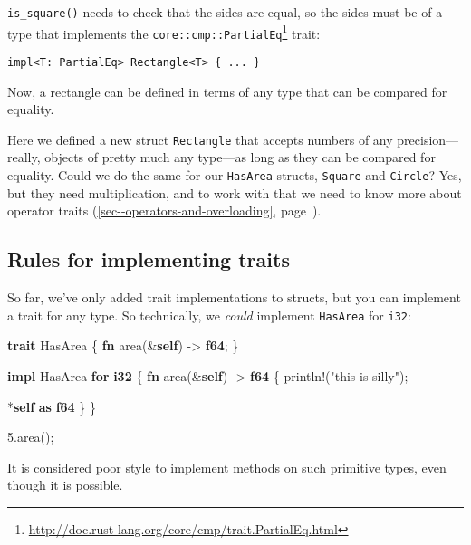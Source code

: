 \documentclass[a4paper,]{book}
\renewcommand*{\hyperref}[2][\ar]{%
  \def\ar{#2}%
  #2 (\autoref{#1}, page~\pageref{#1})}
\newenvironment{Shaded}{\begin{snugshade}}{\end{snugshade}}
\newcommand{\KeywordTok}[1]{\textcolor[rgb]{0.13,0.29,0.53}{\textbf{{#1}}}}
\newcommand{\DecValTok}[1]{\textcolor[rgb]{0.00,0.00,0.81}{{#1}}}
\newcommand{\StringTok}[1]{\textcolor[rgb]{0.31,0.60,0.02}{{#1}}}
\newcommand{\OtherTok}[1]{\textcolor[rgb]{0.56,0.35,0.01}{{#1}}}
\newcommand{\NormalTok}[1]{{#1}}
\renewcommand{\href}[2]{#2\footnote{\url{#1}}}
\begin{document}
\texttt{is\_square()} needs to check that the sides are equal, so the
sides must be of a type that implements the
\href{http://doc.rust-lang.org/core/cmp/trait.PartialEq.html}{\texttt{core::cmp::PartialEq}}
trait:

\begin{verbatim}
impl<T: PartialEq> Rectangle<T> { ... }
\end{verbatim}

Now, a rectangle can be defined in terms of any type that can be
compared for equality.

Here we defined a new struct \texttt{Rectangle} that accepts numbers of
any precision---really, objects of pretty much any type---as long as
they can be compared for equality. Could we do the same for our
\texttt{HasArea} structs, \texttt{Square} and \texttt{Circle}? Yes, but
they need multiplication, and to work with that we need to know more
about \hyperref[sec--operators-and-overloading]{operator traits}.

\subsection{Rules for implementing
traits}\label{rules-for-implementing-traits}

So far, we've only added trait implementations to structs, but you can
implement a trait for any type. So technically, we \emph{could}
implement \texttt{HasArea} for \texttt{i32}:

\begin{Shaded}
\begin{Highlighting}[]
\KeywordTok{trait} \NormalTok{HasArea \{}
    \KeywordTok{fn} \NormalTok{area(&}\KeywordTok{self}\NormalTok{) -> }\KeywordTok{f64}\NormalTok{;}
\NormalTok{\}}

\KeywordTok{impl} \NormalTok{HasArea }\KeywordTok{for} \KeywordTok{i32} \NormalTok{\{}
    \KeywordTok{fn} \NormalTok{area(&}\KeywordTok{self}\NormalTok{) -> }\KeywordTok{f64} \NormalTok{\{}
        \OtherTok{println!}\NormalTok{(}\StringTok{"this is silly"}\NormalTok{);}

        \NormalTok{*}\KeywordTok{self} \KeywordTok{as} \KeywordTok{f64}
    \NormalTok{\}}
\NormalTok{\}}

\DecValTok{5.}\NormalTok{area();}
\end{Highlighting}
\end{Shaded}

It is considered poor style to implement methods on such primitive
types, even though it is possible.
\end{document}

